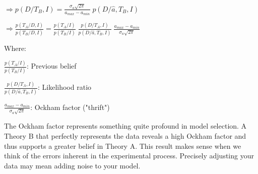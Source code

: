\documentclass{article}
\begin{document}
\hfill

\hfill

$\Rightarrow p(D/T_{B},I) = \frac{\sigma_{a} \sqrt{2 \pi}}{a_{max} - a_{min}} \; p(D/\hat{a},T_{B},I)$

\hfill

$\Rightarrow \frac{p(T_{A}/D,I)}{p(T_{B}/D,I)} = \frac{p(T_{A}/I)}{p(T_{B}/I)} \; \frac{p(D/T_{A},I)}{p(D/\hat{a},T_{B},I)} \; \frac{a_{max} - a_{min}}{\sigma_{a} \sqrt{2 \pi}}$

\hfill

Where:

\hfill

$\frac{p(T_{A}/I)}{p(T_{B}/I)}$: Previous belief

\hfill

$\frac{p(D/T_{A},I)}{p(D/\hat{a},T_{B},I)}$: Likelihood ratio

\hfill

$\frac{a_{max} - a_{min}}{\sigma_{a} \sqrt{2 \pi}}$: Ockham factor ("thrift")

\hfill

The Ockham factor represents something quite profound in model selection. A Theory B that perfectly represents the data reveals a high Ockham factor and thus supports a greater belief in Theory A. This result makes sense when we think of the errors inherent in the experimental process. Precisely adjusting your data may mean adding noise to your model.
\end{document}

